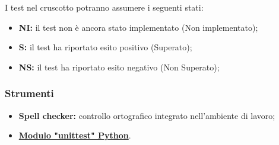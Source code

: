 I test nel cruscotto potranno assumere i seguenti stati:

\begin{itemize}
    \item \textbf{NI:} 
        il test non è ancora stato implementato (Non implementato);
    \item \textbf{S:} 
        il test ha riportato esito positivo (Superato);
    \item \textbf{NS:}
        il test ha riportato esito negativo (Non Superato);
\end{itemize}

\subsubsection{Strumenti}
\begin{itemize}
    \item \textbf{Spell checker:} 
        controllo ortografico integrato nell’ambiente di lavoro;
    \item \href{https://docs.python.org/3/library/unittest.html}{\textbf{Modulo "unittest" Python}}.
\end{itemize}
